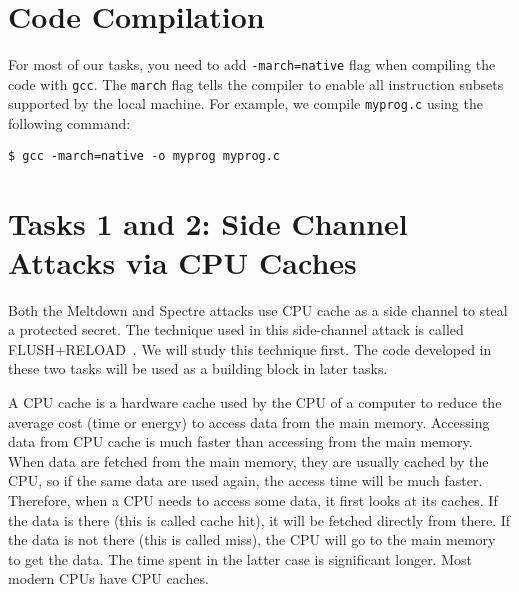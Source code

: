 
\section{Code Compilation}
\label{sidechannel:sec:compilation}


For most of our tasks, you need to add \texttt{-march=native}
flag when compiling the code with
\texttt{gcc}. The \texttt{march} flag tells the compiler to enable all
instruction subsets supported by the local machine.
For example, we compile \texttt{myprog.c} using the following command:

\begin{lstlisting}
$ gcc -march=native -o myprog myprog.c
\end{lstlisting}





\section{Tasks 1 and 2: Side Channel Attacks via CPU Caches}

Both the Meltdown and Spectre attacks use CPU cache as a side channel to steal
a protected secret. The technique used in this side-channel attack is called 
FLUSH+RELOAD~\cite{Yarom2014}. 
We will study this technique first. The code developed in these two tasks will be 
used as a building block in later tasks. 


A CPU cache is a hardware cache used by the CPU of a computer 
to reduce the average cost (time or energy) to access
data from the main memory. Accessing data from CPU cache is much faster
than accessing from the main memory. When data are fetched from the main memory, they
are usually cached by the CPU, so if the same data are used again, the access
time will be much faster. Therefore, when a CPU needs to access some data, it
first looks at its caches. If the data is there (this is called cache hit), 
it will be fetched directly from there. If the data is not there (this is
called miss), the CPU will go to the main memory to get the data. The time 
spent in the latter case is significant longer. Most modern CPUs have
CPU caches. 



